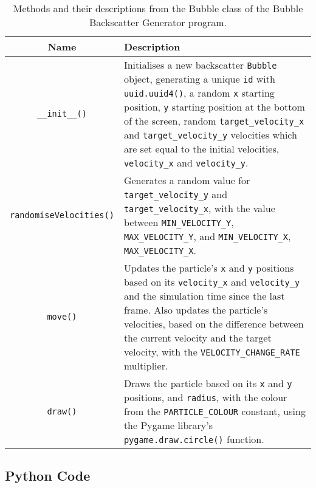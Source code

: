 \begin{table}[H]
    \centering
    \begin{tabularx}{\linewidth}{c | X}
        Name    &   Description\\
        \hline
        \hline
        \texttt{\_\_init\_\_()}     &   Initialises a new backscatter \texttt{Bubble} object, generating a unique \texttt{id} with \texttt{uuid.uuid4()}, a random \texttt{x} starting position, \texttt{y} starting position at the bottom of the screen, random \texttt{target\_velocity\_x} and \texttt{target\_velocity\_y} velocities which are set equal to the initial velocities, \texttt{velocity\_x} and \texttt{velocity\_y}.\\
        \hline
        \texttt{randomiseVelocities()} & Generates a random value for \texttt{target\_velocity\_y} and \texttt{target\_velocity\_x}, with the value between \texttt{MIN\_VELOCITY\_Y}, \texttt{MAX\_VELOCITY\_Y}, and \texttt{MIN\_VELOCITY\_X}, \texttt{MAX\_VELOCITY\_X}.\\
        \hline
        \texttt{move()} & Updates the particle's \texttt{x} and \texttt{y} positions based on its \texttt{velocity\_x} and \texttt{velocity\_y} and the simulation time since the last frame. Also updates the particle's velocities, based on the difference between the current velocity and the target velocity, with the \texttt{VELOCITY\_CHANGE\_RATE} multiplier.\\
        \hline
        \texttt{draw()} & Draws the particle based on its \texttt{x} and \texttt{y} positions, and \texttt{radius}, with the colour from the \texttt{PARTICLE\_COLOUR} constant, using the Pygame library's \texttt{pygame.draw.circle()} function.\\
        \hline
    \end{tabularx}
    \caption{Methods and their descriptions from the Bubble class of the Bubble Backscatter Generator program.}
    \label{table:simbubbleclassfuncs}
\end{table}

\subsection{Python Code}
\label{sim_code}

